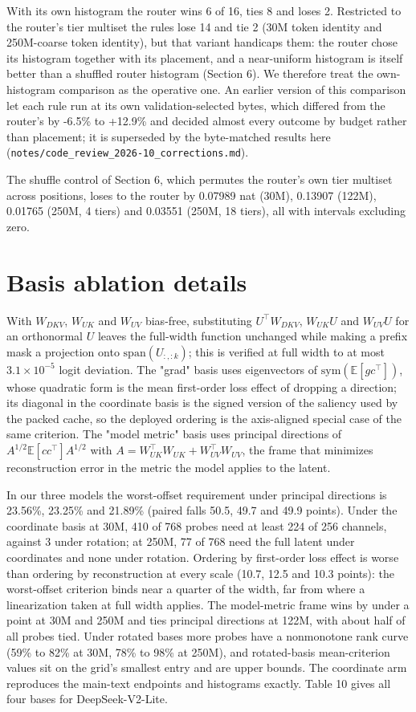 \documentclass[10pt]{article}
\begin{document}
With its own histogram the router wins 6 of 16, ties 8 and loses 2. Restricted to the router's tier multiset the rules lose 14 and tie 2 (30M token identity and 250M-coarse token identity), but that variant handicaps them: the router chose its histogram together with its placement, and a near-uniform histogram is itself better than a shuffled router histogram (Section 6). We therefore treat the own-histogram comparison as the operative one. An earlier version of this comparison let each rule run at its own validation-selected bytes, which differed from the router's by -6.5\% to +12.9\% and decided almost every outcome by budget rather than placement; it is superseded by the byte-matched results here (\texttt{notes/\allowbreak code\_review\_2026-10\_corrections.md}).

The shuffle control of Section 6, which permutes the router's own tier multiset across positions, loses to the router by 0.07989 nat (30M), 0.13907 (122M), 0.01765 (250M, 4 tiers) and 0.03551 (250M, 18 tiers), all with intervals excluding zero.

\section{Basis ablation details}

With $W_{DKV}$, $W_{UK}$ and $W_{UV}$ bias-free, substituting $U^\top W_{DKV}$, $W_{UK}U$ and $W_{UV}U$ for an orthonormal $U$ leaves the full-width function unchanged while making a prefix mask a projection onto $\mathrm{span}(U_{:,:k})$; this is verified at full width to at most $3.1\times10^{-5}$ logit deviation. The "grad" basis uses eigenvectors of $\mathrm{sym}(\mathbb E[gc^\top])$, whose quadratic form is the mean first-order loss effect of dropping a direction; its diagonal in the coordinate basis is the signed version of the saliency used by the packed cache, so the deployed ordering is the axis-aligned special case of the same criterion. The "model metric" basis uses principal directions of $A^{1/2}\mathbb E[cc^\top]A^{1/2}$ with $A=W_{UK}^\top W_{UK}+W_{UV}^\top W_{UV}$, the frame that minimizes reconstruction error in the metric the model applies to the latent.

In our three models the worst-offset requirement under principal directions is 23.56\%, 23.25\% and 21.89\% (paired falls 50.5, 49.7 and 49.9 points). Under the coordinate basis at 30M, 410 of 768 probes need at least 224 of 256 channels, against 3 under rotation; at 250M, 77 of 768 need the full latent under coordinates and none under rotation. Ordering by first-order loss effect is worse than ordering by reconstruction at every scale (10.7, 12.5 and 10.3 points): the worst-offset criterion binds near a quarter of the width, far from where a linearization taken at full width applies. The model-metric frame wins by under a point at 30M and 250M and ties principal directions at 122M, with about half of all probes tied. Under rotated bases more probes have a nonmonotone rank curve (59\% to 82\% at 30M, 78\% to 98\% at 250M), and rotated-basis mean-criterion values sit on the grid's smallest entry and are upper bounds. The coordinate arm reproduces the main-text endpoints and histograms exactly. Table 10 gives all four bases for DeepSeek-V2-Lite.
\end{document}

